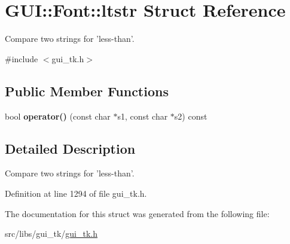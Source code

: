 \hypertarget{structGUI_1_1Font_1_1ltstr}{\section{G\-U\-I\-:\-:Font\-:\-:ltstr Struct Reference}
\label{structGUI_1_1Font_1_1ltstr}
}


Compare two strings for 'less-\/than'.  




{\ttfamily \#include $<$gui\-\_\-tk.\-h$>$}

\subsection*{Public Member Functions}
\begin{DoxyCompactItemize}
\item 
\hypertarget{structGUI_1_1Font_1_1ltstr_ac7c504afcbc1bb5c7d14c84b6fecedc2}{bool {\bfseries operator()} (const char $\ast$s1, const char $\ast$s2) const }\label{structGUI_1_1Font_1_1ltstr_ac7c504afcbc1bb5c7d14c84b6fecedc2}

\end{DoxyCompactItemize}


\subsection{Detailed Description}
Compare two strings for 'less-\/than'. 

Definition at line 1294 of file gui\-\_\-tk.\-h.



The documentation for this struct was generated from the following file\-:\begin{DoxyCompactItemize}
\item 
src/libs/gui\-\_\-tk/\hyperlink{gui__tk_8h}{gui\-\_\-tk.\-h}\end{DoxyCompactItemize}
